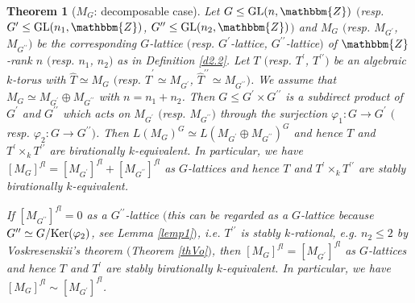 \documentclass{amsart}
\theoremstyle{plain}
\newtheorem{theorem}{Theorem}[section]
\theoremstyle{definition}
\theoremstyle{remark}
\newcommand{\bZ}{\mathbbm{Z}}\newcommand{\bQ}{\mathbbm{Q}}
\newcommand{\GL}{{\rm GL}}\newcommand{\SL}{{\rm SL}}
\newcounter{sub}\def\tr{\mbox{tr }}
\begin{document}
\begin{theorem}[{$M_G$: decomposable case}]\label{th1.24}
Let $G\leq \GL(n,\bZ)$ $($resp. $G^\prime\leq \GL(n_1,\bZ)$, 
$G^{\prime\prime}\leq \GL(n_2,\bZ)$$)$ 
and $M_G$ $($resp. $M_{G^\prime}$, $M_{G^{\prime\prime}}$$)$
be the corresponding $G$-lattice 
$($resp. $G^\prime$-lattice, $G^{\prime\prime}$-lattice$)$ 
of $\bZ$-rank $n$ $($resp. $n_1$, $n_2$$)$ 
as in Definition \ref{d2.2}. 
Let $T$ $($resp. $T^\prime$, $T^{\prime\prime}$$)$ 
be an algebraic $k$-torus with $\widehat{T}\simeq M_G$ 
$($resp. $\widehat{T}^\prime\simeq M_{G^\prime}$, 
$\widehat{T}^{\prime\prime}\simeq M_{G^{\prime\prime}}$$)$. 
We assume that $M_G\simeq M_{G^\prime}\oplus M_{G^{\prime\prime}}$ 
with $n=n_1+n_2$. 
%
Then $G\leq G^\prime\times G^{\prime\prime}$ is a subdirect product 
of $G^\prime$ and $G^{\prime\prime}$ which 
acts on $M_{G^\prime}$ $($resp. $M_{G^{\prime\prime}}$$)$ 
through the surjection 
$\varphi_1: G \rightarrow G^\prime$ 
$($resp. $\varphi_2:G\rightarrow G^{\prime\prime}$$)$. 
Then $L(M_G)^G\simeq L(M_{G^\prime}\oplus M_{G^{\prime\prime}})^G$ 
and hence $T$ and $T^\prime\times_k T^{\prime\prime}$ 
are birationally $k$-equivalent. 
In particular, we have 
$[M_G]^{fl}=[M_{G^\prime}]^{fl}+[M_{G^{\prime\prime}}]^{fl}$ 
as $G$-lattices 
and hence $T$ and $T^\prime\times_k T^{\prime\prime}$ 
are stably birationally $k$-equivalent. 

If $[M_{G^{\prime\prime}}]^{fl}=0$ as a $G^{\prime\prime}$-lattice 
$($this can be regarded as a $G$-lattice 
because $G^{\prime\prime}\simeq G/{\rm Ker}(\varphi_2)$, 
see Lemma \ref{lemp1}$)$, 
i.e. $T^{\prime\prime}$ is stably $k$-rational,  
e.g. $n_2\leq 2$ by Voskresenskii's theorem $($Theorem \ref{thVo}$)$, 
then $[M_G]^{fl}=[M_{G^\prime}]^{fl}$ as $G$-lattices 
and hence $T$ and $T^\prime$ are stably birationally $k$-equivalent. 
%
In particular, we have $[M_G]^{fl} \sim [M_{G^\prime}]^{fl}$. 
\end{theorem}
%
\end{document}
